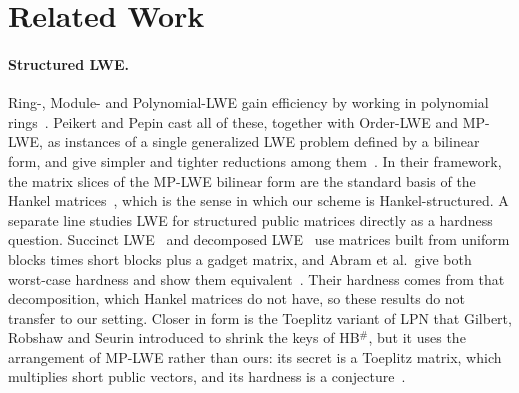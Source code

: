 \documentclass[11pt,a4paper]{article}
\theoremstyle{definition}
\begin{document}
\section{Related Work}\label{sec:related}

\paragraph{Structured LWE.} Ring-, Module- and Polynomial-LWE gain efficiency by working in polynomial rings~\cite{peikert2016decade}. Peikert and Pepin cast all of these, together with Order-LWE and MP-LWE, as instances of a single generalized LWE problem defined by a bilinear form, and give simpler and tighter reductions among them~\cite{peikert2019structured}. In their framework, the matrix slices of the MP-LWE bilinear form are the standard basis of the Hankel matrices~\cite[Sect.~5]{peikert2019structured}, which is the sense in which our scheme is Hankel-structured. A separate line studies LWE for structured public matrices directly as a hardness question. Succinct LWE~\cite{wee2024circuit} and decomposed LWE~\cite{amr2025keyhomomorphic} use matrices built from uniform blocks times short blocks plus a gadget matrix, and Abram et al.\ give both worst-case hardness and show them equivalent~\cite{abram2026succinct}. Their hardness comes from that decomposition, which Hankel matrices do not have, so these results do not transfer to our setting. Closer in form is the Toeplitz variant of LPN that Gilbert, Robshaw and Seurin introduced to shrink the keys of HB$^{\#}$, but it uses the arrangement of MP-LWE rather than ours: its secret is a Toeplitz matrix, which multiplies short public vectors, and its hardness is a conjecture~\cite{grs2008hbsharp}.
\end{document}
